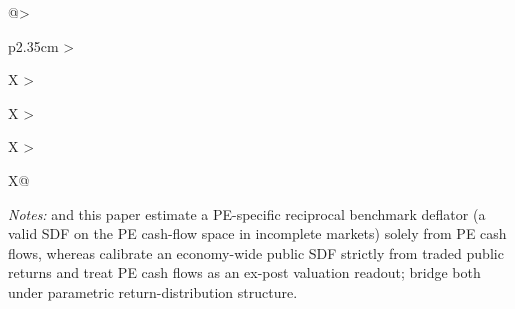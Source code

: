 \begin{table}[htbp]
\begin{tabularx}{\linewidth}{@{}>{\raggedright\arraybackslash}p{2.35cm} >{\raggedright\arraybackslash}X >{\raggedright\arraybackslash}X >{\raggedright\arraybackslash}X >{\raggedright\arraybackslash}X@{}}
\bottomrule
\end{tabularx}
\par\vspace{3pt}
\parbox{\linewidth}{\scriptsize\textit{Notes:} \citet{DLP12} and this paper estimate a PE-specific reciprocal benchmark deflator (a valid SDF on the PE cash-flow space in incomplete markets) solely from PE cash flows, whereas \citet{KN16} calibrate an economy-wide public SDF strictly from traded public returns and treat PE cash flows as an ex-post valuation readout; \citet{KN24} bridge both under parametric return-distribution structure.}
\caption{\textbf{Taxonomy of semiparametric cash-flow discounting frameworks for private equity.}}
\label{tab:comparison}
\end{table}
